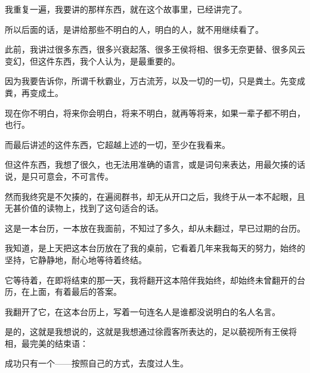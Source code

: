 \begin{multicols}{\theparacolNo}
我重复一遍，我要讲的那样东西，就在这个故事里，已经讲完了。

所以后面的话，是讲给那些不明白的人，明白的人，就不用继续看了。

此前，我讲过很多东西，很多兴衰起落、很多王侯将相、很多无奈更替、很多风云变幻，但这件东西，我个人认为，是最重要的。

因为我要告诉你，所谓千秋霸业，万古流芳，以及一切的一切，只是粪土。先变成粪，再变成土。

现在你不明白，将来你会明白，将来不明白，就再等将来，如果一辈子都不明白，也行。

而最后讲述的这件东西，它超越上述的一切，至少在我看来。

但这件东西，我想了很久，也无法用准确的语言，或是词句来表达，用最欠揍的话说，是只可意会，不可言传。

然而我终究是不欠揍的，在遍阅群书，却无从开口之后，我终于从一本不起眼，且无甚价值的读物上，找到了这句适合的话。

这是一本台历，一本放在我面前，不知过了多久，却从未翻过，早已过期的台历。

我知道，是上天把这本台历放在了我的桌前，它看着几年来我每天的努力，始终的坚持，它静静地，耐心地等待着终结。

它等待着，在即将结束的那一天，我将翻开这本陪伴我始终，却始终未曾翻开的台历，在上面，有着最后的答案。

我翻开了它，在这本台历上，写着一句连名人是谁都没说明白的名人名言。

是的，这就是我想说的，这就是我想通过徐霞客所表达的，足以藐视所有王侯将相，最完美的结束语：

成功只有一个——按照自己的方式，去度过人生。
\ifnum{}
	\end{multicols}
\fi
